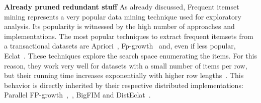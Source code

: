 
 \textbf{Already pruned redundant stuff}
As already discussed, Frequent itemset mining represents a
very popular data mining technique
used for exploratory analysis.
Its popularity is witnessed by the high number of approaches
and implementations.
The most popular techniques to extract frequent itemsets
from a transactional datasets are Apriori~\cite{Agr94}, Fp-growth~\cite{Han00} and, even if less popular, Eclat~\cite{Zaki97newalgorithms}.
These techniques explore the search space enumerating the items.
For this reason, they work very well for datasets
with a small number of items per row,
but their running time increases exponentially
with higher row lengths~\cite{Agr94, Zaki97newalgorithms}.
This behavior is directly inherited by their respective distributed implementations:
Parallel FP-growth~\cite{pfpgrowth},~\cite{citeulike:13636750}, BigFIM and DistEclat~\cite{bigfim}.


